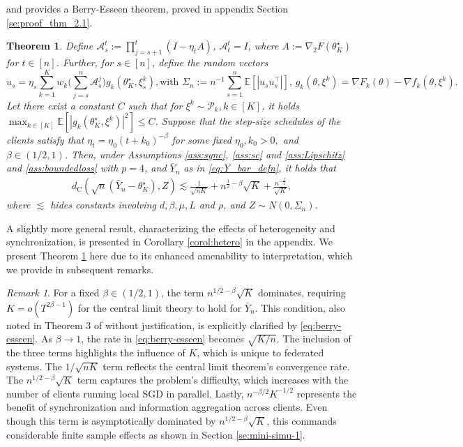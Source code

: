 \documentclass[a4paper,11pt]{article}
\numberwithin{equation}{section}
\theoremstyle{plain}
\newtheorem{theorem}{Theorem}[section]
\theoremstyle{remark}
\newtheorem{remark}{Remark}[section]
\def\IE{\mathbb{E}}
\newcommand{\minparam}{\theta^\star_K}
\begin{document}
and provides a Berry-Esseen theorem, proved in appendix Section \ref{se:proof_thm_2.1}.
\begin{theorem}\label{thm: berry-esseen}
   Define $\mathcal{A}_s^t:=\prod_{j=s+1}^t(I-\eta_tA)$, $\mathcal{A}_t^t=I$, where $A:=\nabla_2 F(\minparam)$ for $t \in [n]$. Further, for $s\in [n]$, define the random vectors 
   \[ u_s = \eta_s\sum_{k=1}^K w_k\bigg(\sum_{j=s}^n \mathcal{A}_s^j\bigg) g_k(\minparam, \xi_s^k), \text{with $\Sigma_n:= n^{-1}\sum_{s=1}^n\IE[|u_s u_s^\top|]$, $g_k(\theta, \xi^{k}) = \nabla F_k(\theta) - \nabla f_k(\theta, \xi^k)$.} \]
Let there exist a constant $C$ such that for $\xi^k\sim \mathcal{P}_k, k\in [K]$, it holds  $\max_{k \in [K]} \IE[|g_k(\minparam, \xi^k)|^2]\leq C$. Suppose that the step-size schedules of the clients satisfy that $ \eta_{t} = \eta_0(t+ k_0)^{-\beta}$ for some fixed $\eta_0, k_0>0,$ and $\beta \in (1/2, 1)$. Then, under Assumptions \ref{ass:sync}, \ref{ass:sc} and \ref{ass:Lipschitz} and \ref{ass:boundedloss} with $p=4$, and $\bar{Y}_n$ as in \eqref{eq:Y_bar_defn}, it holds that
    \begin{align}\label{eq:berry-esseen}
        d_{\mathrm{C}}( \sqrt{n}(\bar{Y}_n - \minparam) , Z)  \lesssim \frac{1}{\sqrt{nK}}  + n^{\frac{1}{2}-\beta} \sqrt{K} + \frac{n^{-\frac{\beta}{2}}}{\sqrt{K}} ,
    \end{align}
    where $\lesssim$ hides constants involving $d, \beta, \mu, L$ and $\rho$, and $Z \sim N(0, \Sigma_n)$. 
\end{theorem}
A slightly more general result, characterizing the effects of heterogeneity and synchronization, is presented in Corollary \ref{corol:hetero} in the appendix. We present Theorem \ref{thm: berry-esseen} here due to its enhanced amenability to interpretation, which we provide in subsequent remarks.
\begin{remark} \label{rem:2.1}
For a fixed $\beta \in (1/2, 1)$, the term $n^{1/2 - \beta} \sqrt{K}$ dominates, requiring $K = o(T^{2\beta - 1})$ for the central limit theory to hold for $\bar{Y}_n$. This condition, also noted in Theorem 3 of \cite{songxichen2024} without justification, is explicitly clarified by \eqref{eq:berry-esseen}. As $\beta \to 1$, the rate in \eqref{eq:berry-esseen} becomes $\sqrt{K/n}$. The inclusion of the three terms highlights the influence of $K$, which is unique to federated systems. The $1/\sqrt{nK}$ term reflects the central limit theorem's convergence rate. The $n^{1/2 - \beta} \sqrt{K}$ term captures the problem's difficulty, which increases with the number of clients running local SGD in parallel. Lastly, $n^{-\beta/2} K^{-1/2}$ represents the benefit of synchronization and information aggregation across clients. Even though this term is asymptotically dominated by $n^{1/2 - \beta} \sqrt{K}$, this commands considerable finite sample effects as shown in Section \ref{se:mini-simu-1}.
\end{remark}
\end{document}
